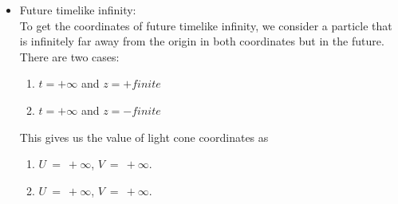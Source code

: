\begin{itemize}
\begin{enumerate}
    \item[(R)]  $U~=~finite$, $V~=~\infty$.
    \item[(L)]  $U~=~\infty$, $V~=~finite$.
\end{enumerate} 
    \item Future timelike infinity: \iplus\\
            To get the coordinates of future timelike infinity, we consider a particle that is infinitely far away from the origin in both coordinates but in the future. There are two cases: \begin{enumerate}
     \item[(R)] $t = +\infty$ and $z = + finite$
     \item[(L)] $t = +\infty$ and $z = - finite$
 \end{enumerate}
This gives us the value of light cone coordinates as \begin{enumerate}
    \item[(R)]  $U~=~+\infty$, $V~=~+\infty$.
    \item[(L)]  $U~=~+\infty$, $V~=~+\infty$.
\end{enumerate}   
\end{itemize}

 
 
